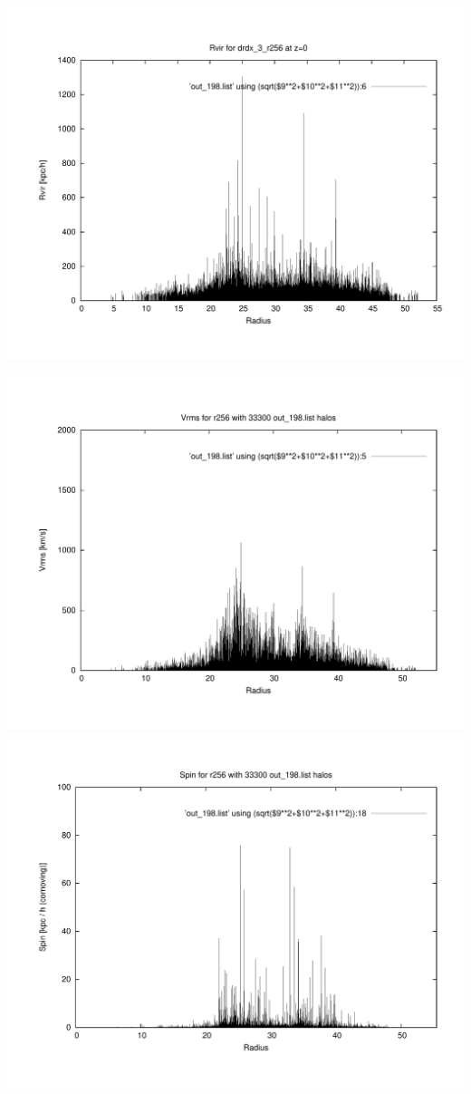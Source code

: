 \includegraphics[scale=0.3]{r256/drdx_3_r256/plot_rvir_z0.pdf}

\includegraphics[scale=0.3]{r256/drdx_3_r256/plot_Vrms_out_198.pdf}
\includegraphics[scale=0.3]{r256/drdx_3_r256/plot_spin_out_198.pdf}

